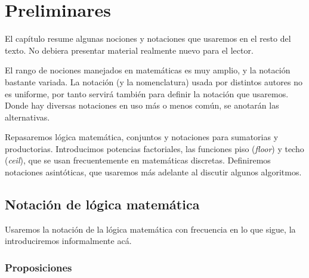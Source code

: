 %

\chapter{Preliminares}
\label{cha:preliminares}

  El capítulo
  resume algunas nociones y notaciones
  que usaremos en el resto del texto.
  No debiera presentar material realmente nuevo para el lector.

  El rango de nociones manejados en matemáticas es muy amplio,
  y la notación bastante variada.
  La notación
  (y la nomenclatura)
  usada por distintos autores no es uniforme,
  por tanto servirá también
  para definir la notación que usaremos.
  Donde hay diversas notaciones en uso más o menos común,
  se anotarán las alternativas.

  Repasaremos lógica matemática,
  conjuntos
  y notaciones para sumatorias y productorias.
  Introducimos potencias factoriales,
  las funciones piso
  (\emph{\foreignlanguage{english}{floor}})
  y techo
  (\emph{\foreignlanguage{english}{ceil}}),
  que se usan frecuentemente en matemáticas discretas.
  Definiremos notaciones asintóticas,
  que usaremos más adelante al discutir algunos algoritmos.

\section{Notación de lógica matemática}
\label{sec:notacion-logica}

  Usaremos la notación de la lógica matemática
  con frecuencia en lo que sigue,
  la introduciremos informalmente acá.

\subsection{Proposiciones}
\label{sec:proposiciones}

